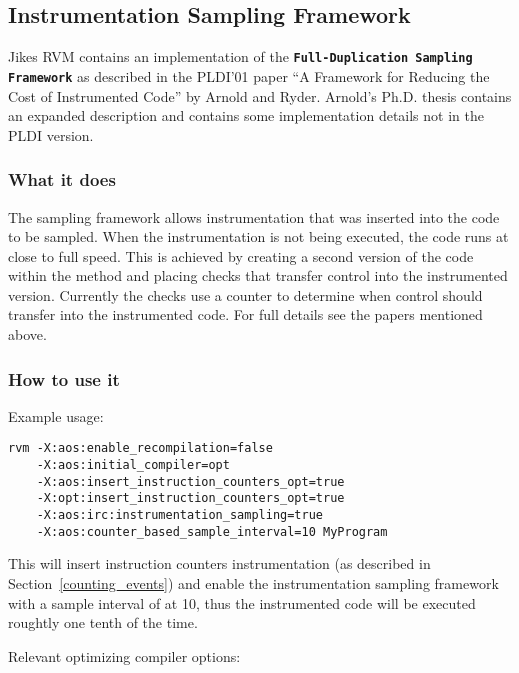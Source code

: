 \subsection{Instrumentation Sampling Framework}
\label{instrumentation_sampling}

Jikes RVM contains an implementation of the {\bf \tt Full-Duplication
Sampling Framework} as described in the PLDI'01 paper ``A Framework
for Reducing the Cost of Instrumented Code'' by Arnold and Ryder.
Arnold's Ph.D. thesis contains an expanded description and contains
some implementation details not in the PLDI version.


\subsubsection{What it does}

The sampling framework allows instrumentation that was inserted into
the code to be sampled.  When the instrumentation is not being
executed, the code runs at close to full speed.  This is achieved by
creating a second version of the code within the method and placing
checks that transfer control into the instrumented version.  Currently
the checks use a counter to determine when control should transfer
into the instrumented code.
For full details see the papers mentioned above. 

\subsubsection{How to use it}

Example usage: 
\begin{verbatim}
rvm -X:aos:enable_recompilation=false
    -X:aos:initial_compiler=opt
    -X:aos:insert_instruction_counters_opt=true
    -X:opt:insert_instruction_counters_opt=true
    -X:aos:irc:instrumentation_sampling=true
    -X:aos:counter_based_sample_interval=10 MyProgram
\end{verbatim}

This will insert instruction counters instrumentation (as described in
Section~\ref{counting_events}) and enable the instrumentation sampling
framework with a sample interval of at 10, thus the instrumented code
will be executed roughtly one tenth of the time.   

Relevant optimizing compiler options:


